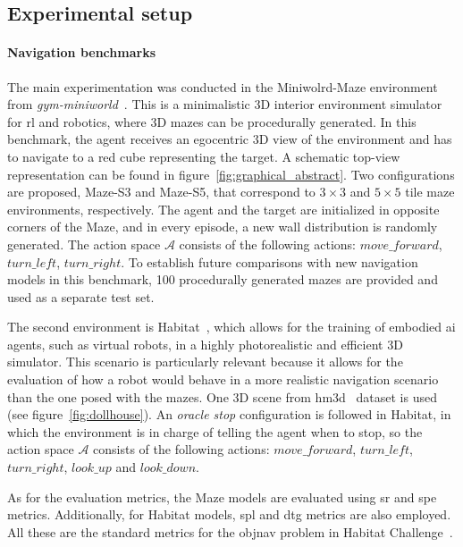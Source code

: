 \subsection{Experimental setup}\label{subsec:experimental-setup}

\paragraph*{Navigation benchmarks}

The main experimentation was conducted in the Miniwolrd-Maze environment from \textit{gym-miniworld}~\cite{gym_miniworld}.
This is a minimalistic 3D interior environment simulator for \acrshort{rl} and robotics, where 3D mazes can be procedurally generated.
In this benchmark, the agent receives an egocentric 3D view of the environment and has to navigate to a red cube representing the target.
A schematic top-view representation can be found in figure~\ref{fig:graphical_abstract}.
Two configurations are proposed, Maze-S3 and Maze-S5, that correspond to $3\times3$ and $5\times5$ tile maze environments, respectively.
The agent and the target are initialized in opposite corners of the Maze, and in every episode, a new wall distribution is randomly generated.
The action space $\mathcal{A}$ consists of the following actions: $move\_forward$, $turn\_left$, $turn\_right$.
To establish future comparisons with new navigation models in this benchmark, 100 procedurally generated mazes are provided and used as a separate test set.


The second environment is Habitat~\cite{szot2021}, which allows for the training of embodied \acrshort{ai} agents, such as virtual robots, in a highly photorealistic and efficient 3D simulator.
This scenario is particularly relevant because it allows for the evaluation of how a robot would behave in a more realistic navigation scenario than the one posed with the mazes.
One 3D scene from \acrshort{hm3d}~\cite{ramakrishnan2021} dataset is used (see figure~\ref{fig:dollhouse}).
An \textit{oracle stop} configuration is followed in Habitat, in which the environment is in charge of telling the agent when to stop, so the action space $\mathcal{A}$ consists of the following actions: $move\_forward$, $turn\_left$, $turn\_right$, $look\_up$ and $look\_down$.

As for the evaluation metrics, the Maze models are evaluated using \acrfull{sr} and \acrfull{spe} metrics.
Additionally, for Habitat models, \acrfull{spl} and \acrfull{dtg} metrics are also employed.
All these are the standard metrics for the \acrfull{objnav} problem in Habitat Challenge~\cite{batra2020}.

